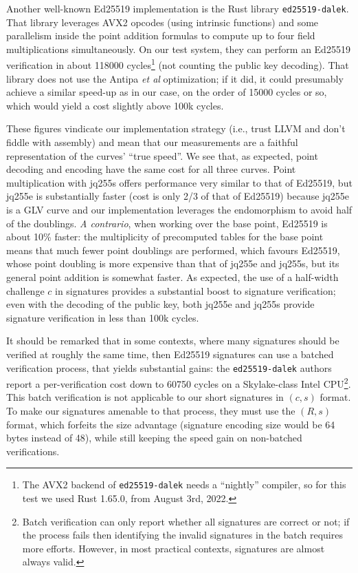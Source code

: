\documentclass{llncs}
\begin{document}
Another well-known Ed25519 implementation is the Rust library
\verb+ed25519-dalek+\cite{dalek-crypto}. That library leverages AVX2
opcodes (using intrinsic functions) and some parallelism inside the
point addition formulas to compute up to four field multiplications
simultaneously. On our test system, they can perform an Ed25519
verification in about 118000 cycles\footnote{The AVX2 backend of
\texttt{ed25519-dalek} needs a ``nightly'' compiler, so for this test we
used Rust 1.65.0, from August 3rd, 2022.} (not counting the public key
decoding). That library does not use the Antipa \emph{et al}
optimization; if it did, it could presumably achieve a similar speed-up
as in our case, on the order of 15000 cycles or so, which would yield
a cost slightly above 100k cycles.

These figures vindicate our implementation strategy (i.e., trust LLVM
and don't fiddle with assembly) and mean that our measurements are a
faithful representation of the curves' ``true speed''. We see that, as
expected, point decoding and encoding have the same cost for all three
curves. Point multiplication with jq255s offers performance very similar
to that of Ed25519, but jq255e is substantially faster (cost is only 2/3
of that of Ed25519) because jq255e is a GLV curve\cite{GalLamVan2001}
and our implementation leverages the endomorphism to avoid half of the
doublings. \emph{A contrario}, when working over the base point, Ed25519
is about 10\% faster: the multiplicity of precomputed tables for the
base point means that much fewer point doublings are performed, which
favours Ed25519, whose point doubling is more expensive than that of
jq255e and jq255s, but its general point addition is somewhat faster. As
expected, the use of a half-width challenge $c$ in signatures provides a
substantial boost to signature verification; even with the decoding of
the public key, both jq255e and jq255s provide signature verification in
less than 100k cycles.

It should be remarked that in some contexts, where many signatures
should be verified at roughly the same time, then Ed25519 signatures can
use a batched verification process, that yields substantial gains: the
\verb+ed25519-dalek+ authors report a per-verification cost down to
60750 cycles on a Skylake-class Intel CPU\footnote{Batch verification
can only report whether all signatures are correct or not; if the
process fails then identifying the invalid signatures in the batch
requires more efforts. However, in most practical contexts, signatures
are almost always valid.}. This batch verification is not applicable to
our short signatures in $(c,s)$ format. To make our signatures amenable
to that process, they must use the $(R,s)$ format, which forfeits the
size advantage (signature encoding size would be 64 bytes instead of
48), while still keeping the speed gain on non-batched verifications.
\end{document}
